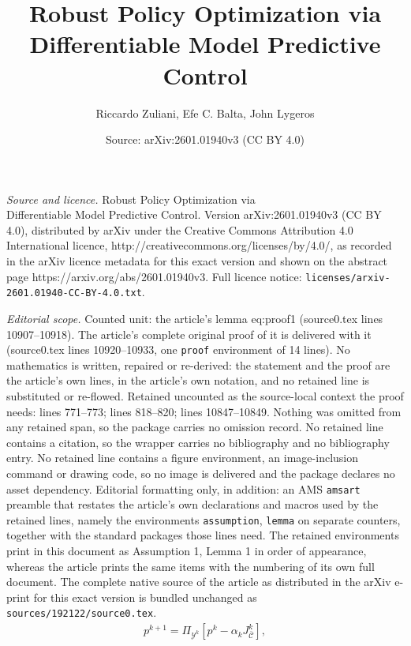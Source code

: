 \documentclass[10pt,a4paper]{amsart}
\title{Robust Policy Optimization via \\ Differentiable Model Predictive Control}
\author{Riccardo Zuliani, Efe C. Balta, John Lygeros}
\date{Source: arXiv:2601.01940v3 (CC BY 4.0)}
\newcommand{\Cb}{{\bar{\mathcal{C}}}}
\begin{document}
\maketitle

\noindent\emph{Source and licence.} Robust Policy Optimization via \\ Differentiable Model Predictive Control. Version arXiv:2601.01940v3 (CC BY 4.0), distributed by arXiv under the Creative Commons Attribution 4.0 International licence, http://creativecommons.org/licenses/by/4.0/, as recorded in the arXiv licence metadata for this exact version and shown on the abstract page https://arxiv.org/abs/2601.01940v3. Full licence notice: \texttt{licenses/arxiv-2601.01940-CC-BY-4.0.txt}.\par\smallskip

\noindent\textit{Editorial scope.} Counted unit: the article's lemma eq:proof1 (source0.tex lines 10907--10918). The article's complete original proof of it is delivered with it (source0.tex lines 10920--10933, one \texttt{proof} environment of 14 lines). No mathematics is written, repaired or re-derived: the statement and the proof are the article's own lines, in the article's own notation, and no retained line is substituted or re-flowed.  Retained uncounted as the source-local context the proof needs: lines 771--773; lines 818--820; lines 10847--10849.  Nothing was omitted from any retained span, so the package carries no omission record.  No retained line contains a citation, so the wrapper carries no bibliography and no bibliography entry.  No retained line contains a figure environment, an image-inclusion command or drawing code, so no image is delivered and the package declares no asset dependency.  Editorial formatting only, in addition: an AMS \texttt{amsart} preamble that restates the article's own declarations and macros used by the retained lines, namely the environments \texttt{assumption}, \texttt{lemma} on separate counters, together with the standard packages those lines need.  The retained environments print in this document as Assumption 1, Lemma 1 in order of appearance, whereas the article prints the same items with the numbering of its own full document.  The complete native source of the article as distributed in the arXiv e-print for this exact version is bundled unchanged as \texttt{sources/192122/source0.tex}.
\begin{align}
p^{k+1} = \Pi_{\mathcal{Y}^k}[p^k - \alpha_k J_\Cb^k], \label{eq:update}
\end{align}
\end{document}
